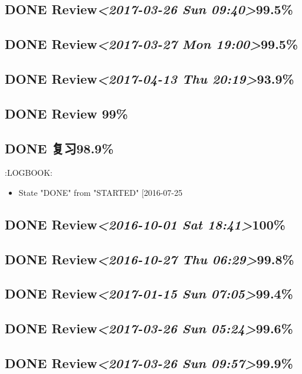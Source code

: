 \documentclass[11pt]{ctexart}
\begin{document}
\subsection{{\bfseries\sffamily DONE} Review\textit{<2017-03-26 Sun 09:40>}99.5\%}
\label{sec:org09e38e4}
\subsection{{\bfseries\sffamily DONE} Review\textit{<2017-03-27 Mon 19:00>}99.5\%}
\label{sec:org4e2a898}
\subsection{{\bfseries\sffamily DONE} Review\textit{<2017-04-13 Thu 20:19>}93.9\%}
\label{sec:org567bebc}


\subsection{{\bfseries\sffamily DONE} Review 99\%}
\label{sec:org59afbc3}
\subsection{{\bfseries\sffamily DONE} 复习98.9\%}
\label{sec:orga69aaf2}
:LOGBOOK:
\begin{itemize}
\item State "DONE"       from "STARTED"    [2016-07-25
\end{itemize}
\subsection{{\bfseries\sffamily DONE} Review\textit{<2016-10-01 Sat 18:41>}100\%}
\label{sec:orgf1a9db2}
\subsection{{\bfseries\sffamily DONE} Review\textit{<2016-10-27 Thu 06:29>}99.8\%}
\label{sec:org4be4d11}
\subsection{{\bfseries\sffamily DONE} Review\textit{<2017-01-15 Sun 07:05>}99.4\%}
\label{sec:orgc4b1df9}
\subsection{{\bfseries\sffamily DONE} Review\textit{<2017-03-26 Sun 05:24>}99.6\%}
\label{sec:orgfc45af6}
\subsection{{\bfseries\sffamily DONE} Review\textit{<2017-03-26 Sun 09:57>}99.9\%}
\label{sec:org497b3da}
\end{document}
